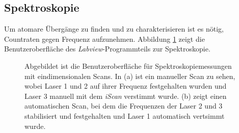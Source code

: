 \subsection{Spektroskopie}\label{subsec:spektroskopie_software}
Um atomare Übergänge zu finden und zu charakterisieren ist es nötig, Countraten
gegen Frequenz aufzunehmen. Abbildung \ref{fig:spektroskopie_benutzeroberflaeche}
zeigt die Benutzeroberfläche des \textit{Labview}-Programmteils zur
Spektroskopie.
\begin{figure}[h]
 	\centering
	\caption[Benutzeroberfläche
	Spektroskopie]{Abgebildet ist die Benutzeroberfläche für
	Spektroskopiemessungen mit eindimensionalen Scans. In (a) ist ein manueller
	Scan zu sehen, wobei Laser 1 und 2 auf ihrer Frequenz festgehalten wurden und Laser 3 manuell mit dem
	\textit{iScan} verstimmt wurde. (b) zeigt einen automatischen Scan, bei dem die
	Frequenzen der Laser 2 und 3 stabilisiert und festgehalten und Laser 1
	automatisch vertsimmt wurde.}
	\label{fig:spektroskopie_benutzeroberflaeche}
\end{figure}

